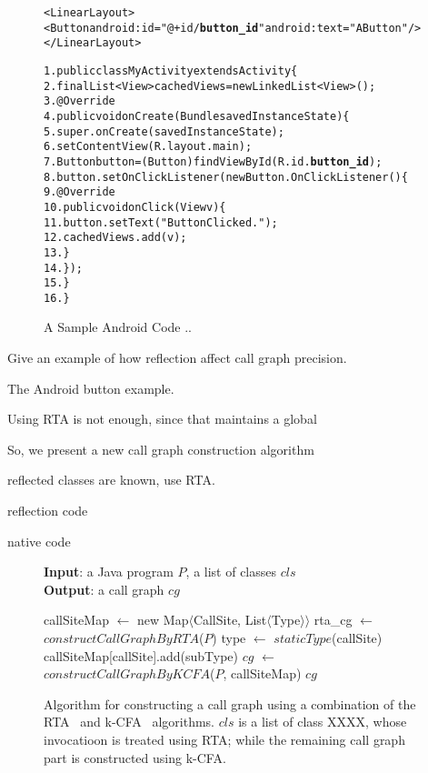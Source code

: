 \begin{figure}[t]
\begin{CodeOut}
\begin{alltt}

<LinearLayout>
    <Button android:id="@+id/\textbf{button\_id}" android:text="A Button" />
</LinearLayout>

1. public class MyActivity extends Activity \{
2.    final List<View> cachedViews = new LinkedList<View>();
3.    @Override
4.    public void onCreate(Bundle savedInstanceState) \{
5.        super.onCreate(savedInstanceState);
6.        setContentView(R.layout.main);
7.        Button button = (Button) findViewById(R.id.\textbf{button\_id});
8.        button.setOnClickListener(new Button.OnClickListener() \{
9.            @Override
10.           public void onClick(View v) \{
11.               button.setText("Button Clicked.");
12.               cachedViews.add(v);
13.           \}
14.       \});
15.   \}
16. \}
\end{alltt}
\end{CodeOut}
\label{fig:sampleandroid}
\caption{A Sample Android Code ..}
\end{figure}


Give an example of how reflection affect call graph precision.

The Android button example.

Using RTA is not enough, since that maintains a global

So, we present a new call graph construction algorithm

reflected classes are known, use RTA.

reflection code

native code

\begin{figure}[t]
\textbf{Input}: a Java program $P$, a list of classes $cls$\\
\textbf{Output}: a call graph $cg$\\
\vspace{-5mm}
\begin{algorithmic}[1]
\STATE callSiteMap $\leftarrow$ new Map$\langle$CallSite, List$\langle$Type$\rangle$$\rangle$
\STATE rta\_cg $\leftarrow$ $constructCallGraphByRTA$($P$)
\STATE type $\leftarrow$ $staticType$(callSite)
\STATE callSiteMap[callSite].add(subType)
\ENDIF
\ENDFOR
\ENDIF
\ENDFOR
\ENDFOR
\STATE $cg$ $\leftarrow$ $constructCallGraphByKCFA$($P$, callSiteMap)
\RETURN $cg$
\vspace{-2mm}
\end{algorithmic}
\caption{Algorithm for constructing a call graph using a combination of the RTA~\cite{rta} and k-CFA~\cite{kcfa} algorithms.
$cls$ is a list of class XXXX, whose invocatioon is treated using RTA; while the remaining call graph
part is constructed using k-CFA.
} \label{fig:cgalgorithm}
\end{figure}




